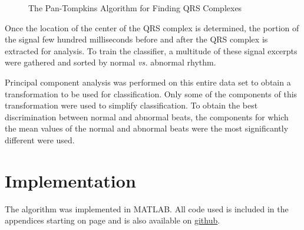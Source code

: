 \documentclass[titlepage,12pt,letter]{article}
\begin{document}
\begin{figure}[hbtp]
    \centering
    \caption{The Pan-Tompkins Algorithm for Finding QRS Complexes}
    \label{fig:pan}
\end{figure}

Once the location of the center of the QRS complex is determined, the portion of
the signal few hundred milliseconds before and after the QRS complex is
extracted for analysis.  To train the classifier, a multitude of these signal
excerpts were gathered and sorted by normal \textit{vs.} abnormal rhythm.

Principal component analysis was performed on this entire data set to obtain a
transformation to be used for classification.  Only some of the components of
this transformation were used to simplify classification.  To obtain the best
discrimination between normal and abnormal beats, the components for which the
mean values of the normal and abnormal beats were the most significantly
different were used.  

\section{Implementation}
The algorithm was implemented in MATLAB.  All code used is included in the
appendices starting on page \pageref{fun:fetch} and is also available on
\href{https://github.com/robbystk/Arrythmias}{github}.
\end{document}
